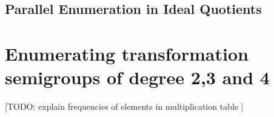 \documentclass{amsart}
\newcommand{\todo}[1]{ \small \textsf{[TODO:  #1 ]} \normalsize}
\theoremstyle{plain}
\theoremstyle{definition}
\begin{document}
\subsection{Parallel Enumeration in Ideal Quotients}

\section{Enumerating transformation semigroups of degree 2,3 and 4}

\todo{explain frequencies of elements in multiplication table}



\end{document}

